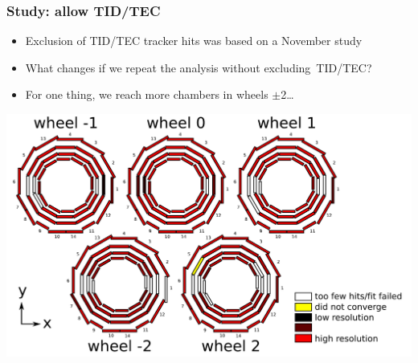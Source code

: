 \documentclass[compress]{beamer}
\begin{document}
\begin{frame}
\frametitle{Study: allow TID/TEC}

\begin{itemize}
\item Exclusion of TID/TEC tracker hits was based on a November study
\item What changes if we repeat the analysis without \mbox{excluding TID/TEC?\hspace{-1 cm}}
\item For one thing, we reach more chambers in wheels $\pm$2\ldots
\end{itemize}

\includegraphics[width=\linewidth]{data_convergence_withTIDTEC.pdf}
\end{frame}
\end{document}
